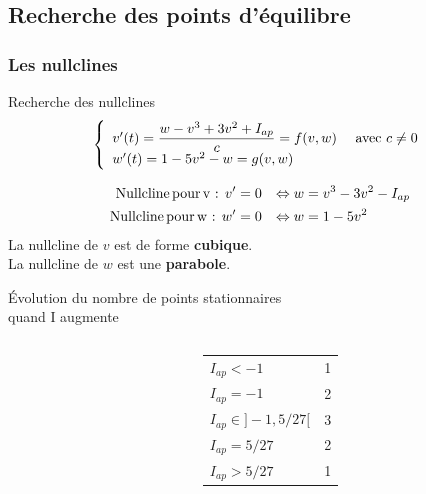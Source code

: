 \documentclass[xcolor={dvipsnames},10pt]{beamer}
\begin{document}
\subsection{Recherche des points d'équilibre}
\subsubsection*{Les nullclines}
\begin{frame}{Recherche des nullclines}
\begin{equation*}
\left\{
\begin{array}{l l}
v'(t)= \displaystyle{\frac{w - v^3 + 3v^2 +I_{ap}}{c}} = f(v,w) & \text{ avec } c\neq 0\\
w'(t) = 1 - 5 v^2 - w = g(v,w) & \\
\end{array}
\right.
\end{equation*}

\begin{align*}
\text{Nullcline\,pour\,v : } v' &= 0  &\Leftrightarrow w &= v^3 - 3 v^2 - I_{ap}\\
\text{Nullcline\,pour\,w : } w' &= 0 &\Leftrightarrow w &= 1-5v^2
\end{align*}
La nullcline de $v$ est de forme \textbf{cubique}. \\
La nullcline de $w$ est une \textbf{parabole}.
\end{frame}


\begin{frame}{Évolution du nombre de points stationnaires \\ quand I augmente}
\begin{columns}
	\begin{column}{0.5\textwidth}
	\end{column}
	\begin{column}{0.4\textwidth}  %
		\begin{center}
		\begin{tabular}{l l}
			$I_{ap}< - 1$ &  1 \\
			$I_{ap}= - 1$ &  2 \\
			$I_{ap} \in ]-1, 5/27[$ &  3 \\
			$I_{ap}=5/27$  &  2 \\
			$I_{ap}> 5/27$ &  1 \\
		\end{tabular}
		\end{center}
	\end{column}
\end{columns}
\end{frame}
\end{document}
